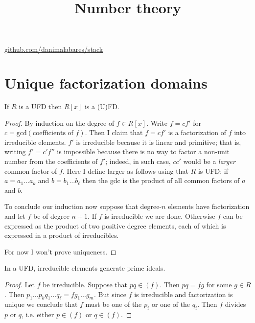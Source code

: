 



\title{Number theory}
\maketitle

\label{section-phantom}
\hfill
\href{http://github.com/danimalabares/stack}{github.com/danimalabares/stack}

\tableofcontents




\section{Unique factorization domains}
\label{section-UFD}

\begin{lemma}
\label{lemma-Gauss}
If $R$ is a UFD then $R[x]$ is a (U)FD.
\end{lemma}

\begin{proof}
By induction on the degree of $f \in R[x]$. Write $f=cf'$ for
$c=\text{gcd}(\text{coefficients of $f$})$. Then I claim that $f=cf'$ is a
factorization of $f$ into irreducible elements. $f'$ is irreducible because it
is linear and primitive; that is, writing $f'=c'f''$ is impossible because
there is no way to factor a non-unit number from the coefficients of $f'$;
indeed, in such case, $cc'$ would be a {\it larger} common factor of $f$. Here I
define larger as follows using that $R$ is UFD: if $a=a_1\ldots a_k$ and
$b=b_1\ldots b_\ell$ then the gdc is the product of all common factors of $a$
and $b$.

To conclude our induction now suppose that degree-$n$ elements have
factorization and let $f$ be of degree $n+1$. If $f$ is irreducible we are done.
Otherwise $f$ can be expressed as the product of two positive degree elements,
each of which is expressed in a product of irreducibles.

For now I won't prove uniqueness.
\end{proof}

\begin{lemma}
\label{lemma-in-UFD-irreducible-elements-generate-prime-ideals}
In a UFD, irreducible elements generate prime ideals.
\end{lemma}

\begin{proof}
Let $f$ be irreducible. Suppose that $pq\in(f)$. Then $pq=fg$ for some  $g\in
R$. Then $p_1\ldots p_kq_1\ldots q_\ell=fg_1\ldots g_m$. But since $f$ is
irreducible and factorization is unique we conclude that $f$ must be one of the
 $p_i$ or one of the $q_i$. Then $f$ divides $p$ or $q$, i.e. either $p\in(f)$
or $q\in(f)$.
\end{proof}



